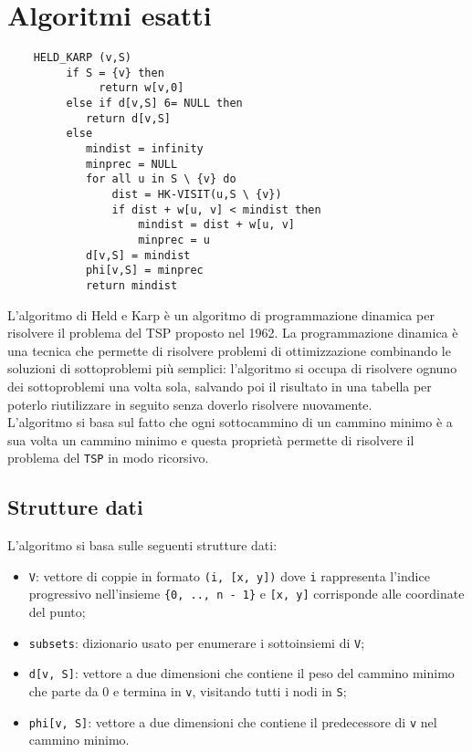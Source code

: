 \section{Algoritmi esatti}\label{prim}
\begin{lstlisting}
	HELD_KARP (v,S)
		 if S = {v} then
		 	  return w[v,0]   
		 else if d[v,S] 6= NULL then
		 	return d[v,S]
		 else
		 	mindist = infinity
		 	minprec = NULL
		 	for all u in S \ {v} do 
		 		dist = HK-VISIT(u,S \ {v})
		 		if dist + w[u, v] < mindist then
		 			mindist = dist + w[u, v]
		 			minprec = u
		 	d[v,S] = mindist
		 	phi[v,S] = minprec  
		 	return mindist                      
\end{lstlisting}

L’algoritmo di Held e Karp è un algoritmo di programmazione dinamica per risolvere il problema del TSP proposto nel 1962. La programmazione dinamica è una tecnica che permette di risolvere problemi di ottimizzazione
combinando le soluzioni di sottoproblemi più semplici: l'algoritmo si occupa di risolvere ognuno dei sottoproblemi una volta sola, salvando poi il risultato in una tabella per poterlo riutilizzare in seguito senza doverlo risolvere nuovamente. \\
L'algoritmo si basa sul fatto che ogni sottocammino di un cammino minimo è a sua volta un cammino minimo e questa proprietà permette di risolvere il problema del \texttt{TSP} in modo ricorsivo.

\subsection{Strutture dati}
L'algoritmo si basa sulle seguenti strutture dati:
\begin{itemize}
	\item \texttt{V}: vettore di coppie in formato \texttt{(i, [x, y])} dove \texttt{i} rappresenta l'indice progressivo nell'insieme \texttt{\{0, .., n - 1\}} e \texttt{[x, y]} corrisponde alle coordinate del punto;
	\item \texttt{subsets}: dizionario usato per enumerare i sottoinsiemi di \texttt{V};
	\item \texttt{d[v, S]}: vettore a due dimensioni che contiene il peso del cammino minimo che parte da 0 e termina in \texttt{v}, visitando tutti i nodi in \texttt{S};
	\item \texttt{phi[v, S]}: vettore a due dimensioni che contiene il predecessore di \texttt{v} nel cammino minimo.
\end{itemize}




